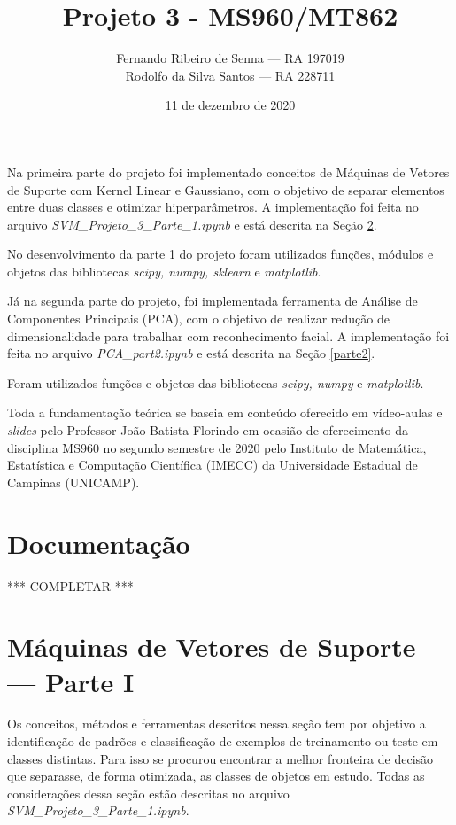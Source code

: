 \documentclass[12pt]{article}
\title{Projeto 3 - MS960/MT862}
\author{Fernando Ribeiro de Senna --- RA 197019\\
Rodolfo da Silva Santos --- RA 228711}
\date{11 de dezembro de 2020}
\begin{document}
\maketitle

Na primeira parte do projeto foi implementado conceitos de Máquinas de Vetores de Suporte com Kernel Linear e Gaussiano, com o objetivo de separar elementos entre duas classes e otimizar hiperparâmetros. A implementação foi feita no arquivo \textit{ SVM\_Projeto\_3\_Parte\_1.ipynb} e está descrita na Seção \ref{parte1}.

No desenvolvimento da parte 1 do projeto foram utilizados funções, módulos e objetos das bibliotecas \textit{scipy, numpy, sklearn} e \textit{matplotlib}.


Já na segunda parte do projeto, foi implementada ferramenta de Análise de Componentes Principais (PCA), com o objetivo de realizar redução de dimensionalidade para trabalhar com reconhecimento facial. A implementação foi feita no arquivo \textit{PCA\_part2.ipynb} e está descrita na Seção \ref{parte2}.

Foram utilizados funções e objetos das bibliotecas \textit{scipy, numpy} e \textit{matplotlib}. 

Toda a fundamentação teórica se baseia em conteúdo oferecido em vídeo-aulas e \textit{slides} pelo Professor João Batista Florindo em ocasião de oferecimento da disciplina MS960 no segundo semestre de 2020 pelo Instituto de Matemática, Estatística e Computação Científica (IMECC) da Universidade Estadual de Campinas (UNICAMP).


\section{Documentação} \label{doc}
*** COMPLETAR ***



\section{Máquinas de Vetores de Suporte --- Parte I} \label{parte1}

Os conceitos, métodos e ferramentas descritos nessa seção tem por objetivo a identificação de padrões e classificação de exemplos de treinamento ou teste em classes distintas. Para isso se procurou encontrar a melhor fronteira de decisão que separasse, de forma otimizada, as classes de objetos em estudo. Todas as considerações dessa seção estão descritas no arquivo \textit{ SVM\_Projeto\_3\_Parte\_1.ipynb}.
\end{document}
